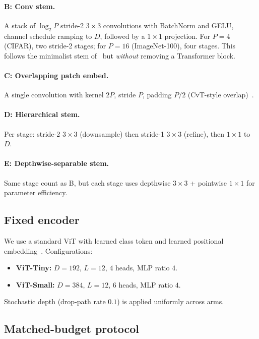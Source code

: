 \documentclass[10pt,twocolumn]{article}
\begin{document}
\paragraph{B: Conv stem.}
A stack of $\log_2 P$ stride-2 $3{\times}3$ convolutions with BatchNorm and GELU, channel schedule ramping to $D$, followed by a $1{\times}1$ projection.
For $P{=}4$ (CIFAR), two stride-2 stages; for $P{=}16$ (ImageNet-100), four stages.
This follows the minimalist stem of~\cite{xiao2021early} but \emph{without} removing a Transformer block.

\paragraph{C: Overlapping patch embed.}
A single convolution with kernel $2P$, stride $P$, padding $P/2$ (CvT-style overlap)~\cite{wu2021cvt}.

\paragraph{D: Hierarchical stem.}
Per stage: stride-2 $3{\times}3$ (downsample) then stride-1 $3{\times}3$ (refine), then $1{\times}1$ to $D$.

\paragraph{E: Depthwise-separable stem.}
Same stage count as B, but each stage uses depthwise $3{\times}3$ + pointwise $1{\times}1$ for parameter efficiency.

\subsection{Fixed encoder}

We use a standard ViT with learned class token and learned positional embedding~\cite{dosovitskiy2021vit}.
Configurations:
\begin{itemize}
  \item \textbf{ViT-Tiny:} $D{=}192$, $L{=}12$, $4$ heads, MLP ratio $4$.
  \item \textbf{ViT-Small:} $D{=}384$, $L{=}12$, $6$ heads, MLP ratio $4$.
\end{itemize}
Stochastic depth (drop-path rate $0.1$) is applied uniformly across arms.

\subsection{Matched-budget protocol}
\end{document}
